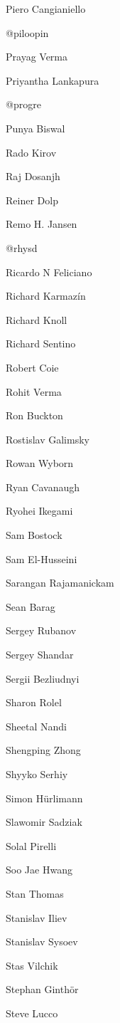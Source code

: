 \begin{DoxyItemize}
\item Piero Cangianiello
\item @piloopin
\item Prayag Verma
\item Priyantha Lankapura
\item @progre
\item Punya Biswal
\item Rado Kirov
\item Raj Dosanjh
\item Reiner Dolp
\item Remo H. Jansen
\item @rhysd
\item Ricardo N Feliciano
\item Richard Karmazín
\item Richard Knoll
\item Richard Sentino
\item Robert Coie
\item Rohit Verma
\item Ron Buckton
\item Rostislav Galimsky
\item Rowan Wyborn
\item Ryan Cavanaugh
\item Ryohei Ikegami
\item Sam Bostock
\item Sam El-\/\+Husseini
\item Sarangan Rajamanickam
\item Sean Barag
\item Sergey Rubanov
\item Sergey Shandar
\item Sergii Bezliudnyi
\item Sharon Rolel
\item Sheetal Nandi
\item Shengping Zhong
\item Shyyko Serhiy
\item Simon Hürlimann
\item Slawomir Sadziak
\item Solal Pirelli
\item Soo Jae Hwang
\item Stan Thomas
\item Stanislav Iliev
\item Stanislav Sysoev
\item Stas Vilchik
\item Stephan Ginthör
\item Steve Lucco

\end{DoxyItemize}

